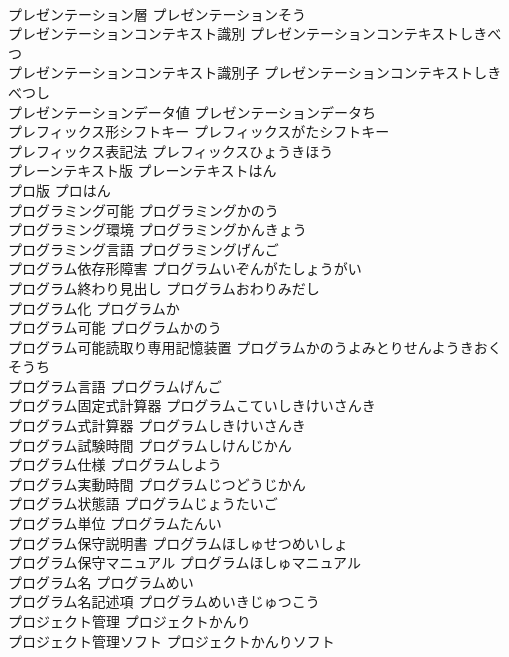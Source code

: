 \documentclass[8pt]{extreport}
\begin{document}
\begin{CJK}{UTF8}{min}
\\	プレゼンテーション層	プレゼンテーションそう	
\\	プレゼンテーションコンテキスト識別	プレゼンテーションコンテキストしきべつ	
\\	プレゼンテーションコンテキスト識別子	プレゼンテーションコンテキストしきべつし	
\\	プレゼンテーションデータ値	プレゼンテーションデータち	
\\	プレフィックス形シフトキー	プレフィックスがたシフトキー	
\\	プレフィックス表記法	プレフィックスひょうきほう	
\\	プレーンテキスト版	プレーンテキストはん	
\\	プロ版	プロはん	
\\	プログラミング可能	プログラミングかのう	
\\	プログラミング環境	プログラミングかんきょう	
\\	プログラミング言語	プログラミングげんご	
\\	プログラム依存形障害	プログラムいぞんがたしょうがい	
\\	プログラム終わり見出し	プログラムおわりみだし	
\\	プログラム化	プログラムか	
\\	プログラム可能	プログラムかのう	
\\	プログラム可能読取り専用記憶装置	プログラムかのうよみとりせんようきおくそうち	
\\	プログラム言語	プログラムげんご	
\\	プログラム固定式計算器	プログラムこていしきけいさんき	
\\	プログラム式計算器	プログラムしきけいさんき	
\\	プログラム試験時間	プログラムしけんじかん	
\\	プログラム仕様	プログラムしよう	
\\	プログラム実動時間	プログラムじつどうじかん	
\\	プログラム状態語	プログラムじょうたいご	
\\	プログラム単位	プログラムたんい	
\\	プログラム保守説明書	プログラムほしゅせつめいしょ	
\\	プログラム保守マニュアル	プログラムほしゅマニュアル	
\\	プログラム名	プログラムめい	
\\	プログラム名記述項	プログラムめいきじゅつこう	
\\	プロジェクト管理	プロジェクトかんり	
\\	プロジェクト管理ソフト	プロジェクトかんりソフト	

\end{CJK}
\end{document}
